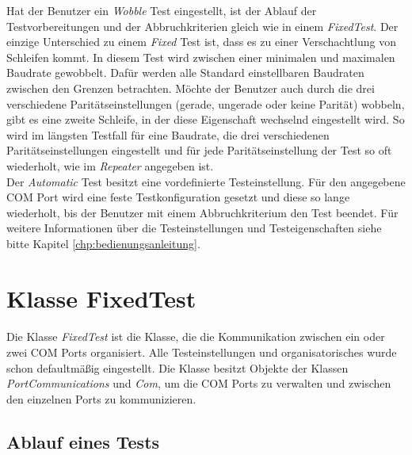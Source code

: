Hat der Benutzer ein \textit{Wobble} Test eingestellt, ist der Ablauf der Testvorbereitungen und der Abbruchkriterien gleich wie in einem \textit{FixedTest}. Der einzige Unterschied zu einem \textit{Fixed} Test ist, dass es zu einer Verschachtlung von Schleifen kommt. In diesem Test wird zwischen einer minimalen und maximalen Baudrate gewobbelt. Dafür werden alle Standard einstellbaren Baudraten zwischen den Grenzen betrachten. Möchte der Benutzer auch durch die drei verschiedene Paritätseinstellungen (gerade, ungerade oder keine Parität) wobbeln, gibt es eine zweite Schleife, in der diese Eigenschaft wechselnd eingestellt wird. So wird im längsten Testfall für eine  Baudrate, die drei verschiedenen Paritätseinstellungen eingestellt und für jede Paritätseinstellung der Test so oft wiederholt, wie im \textit{Repeater} angegeben ist.\\


Der \textit{Automatic} Test besitzt eine vordefinierte Testeinstellung. Für den angegebene COM Port wird eine feste Testkonfiguration gesetzt und diese so lange wiederholt, bis der Benutzer mit einem Abbruchkriterium den Test beendet. Für weitere Informationen über die Testeinstellungen und Testeigenschaften siehe bitte Kapitel \ref{chp:bedienungsanleitung}.

\newpage


\section{Klasse FixedTest}\label{FixedTextClass}
\paragraph{}
Die Klasse \textit{FixedTest} ist die Klasse, die die Kommunikation zwischen ein oder zwei COM Ports organisiert. Alle Testeinstellungen und organisatorisches wurde schon defaultmäßig eingestellt. Die Klasse besitzt Objekte der Klassen \textit{PortCommunications} und \textit{Com}, um die COM Ports zu verwalten und zwischen den einzelnen Ports zu kommunizieren.\\

\subsection{Ablauf eines Tests}
